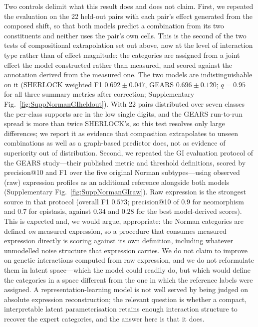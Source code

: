 Two controls delimit what this result does and does not claim. First, we repeated the evaluation on
the 22 held-out pairs with each pair's effect generated from the composed shift, so that both models
predict a combination from its two constituents and neither uses the pair's own cells. This is the
second of the two tests of compositional extrapolation set out above, now at the level of interaction
type rather than of effect magnitude: the categories are assigned from a joint effect the model
constructed rather than measured, and scored against the annotation derived from the measured one.
The two models are indistinguishable on it (SHERLOCK weighted F1 $0.692\pm0.047$, GEARS
$0.696\pm0.120$; $q=0.95$ for all three summary metrics after correction; Supplementary
Fig.~\ref{fig:SuppNormanGIheldout}). With 22 pairs distributed over seven classes the per-class
supports are in the low single digits, and the GEARS run-to-run spread is more than twice
SHERLOCK's, so this test resolves only large differences; we report it as evidence that composition
extrapolates to unseen combinations as well as a graph-based predictor does, not as evidence of
superiority out of distribution. Second, we repeated the GI
evaluation protocol of the GEARS study---their published metric and threshold definitions, scored by
precision@10 and F1 over the five original Norman subtypes---using observed (raw) expression profiles
as an additional reference alongside both models (Supplementary Fig.~\ref{fig:SuppNormanGIraw}). Raw
expression is the strongest source in that protocol (overall F1 $0.573$; precision@10 of $0.9$ for
neomorphism and $0.7$ for epistasis, against $0.34$ and $0.28$ for the best model-derived scores).
This is expected and, we would argue, appropriate: the Norman categories are defined \emph{on}
measured expression, so a procedure that consumes measured expression directly is scoring against its
own definition, including whatever unmodelled noise structure that expression carries. We do not
claim to improve on genetic interactions computed from raw expression, and we do not reformulate them
in latent space---which the model could readily do, but which would define the categories in a space
different from the one in which the reference labels were assigned. A representation-learning model
is not well served by being judged on absolute expression reconstruction; the relevant question is
whether a compact, interpretable latent parameterisation retains enough interaction structure to
recover the expert categories, and the answer here is that it does.

